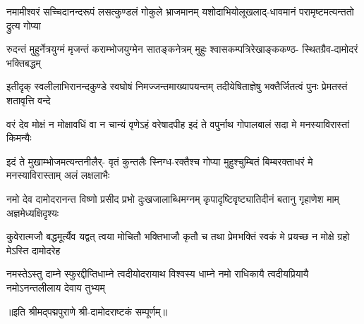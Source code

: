 
\fourlineindentedshloka
{नमामीश्वरं सच्चिदानन्दरूपं}
{लसत्कुण्डलं गोकुले भ्राजमानम्}
{यशोदाभियोलूखलाद्-धावमानं}
{परामृष्टमत्यन्ततो द्रुत्य गोप्या}

\fourlineindentedshloka
{रुदन्तं मुहुर्नेत्रयुग्मं मृजन्तं}
{कराम्भोजयुग्मेन सातङ्कनेत्रम्}
{मुहुः श्वासकम्पत्रिरेखाङ्ककण्ठ-}
{स्थितग्रैव-दामोदरं भक्तिबद्धम्}

\fourlineindentedshloka
{इतीदृक् स्वलीलाभिरानन्दकुण्डे}
{स्वघोषं निमज्जन्तमाख्यापयन्तम्}
{तदीयेषिताज्ञेषु भक्तैर्जितत्वं}
{पुनः प्रेमतस्तं शतावृत्ति वन्दे}

\fourlineindentedshloka
{वरं देव मोक्षं न मोक्षावधिं वा}
{न चान्यं वृणेऽहं वरेषादपीह}
{इदं ते वपुर्नाथ गोपालबालं}
{सदा मे मनस्याविरास्तां किमन्यैः}

\fourlineindentedshloka
{इदं ते मुखाम्भोजमत्यन्तनीलैर्-}
{वृतं कुन्तलैः स्निग्ध-रक्तैश्च गोप्या}
{मुहुश्चुम्बितं बिम्बरक्ताधरं मे}
{मनस्याविरास्ताम् अलं लक्षलाभैः}

\fourlineindentedshloka
{नमो देव दामोदरानन्त विष्णो}
{प्रसीद प्रभो दुःखजालाब्धिमग्नम्}
{कृपादृष्टिवृष्ट्यातिदीनं बतानु}
{गृहाणेश माम् अज्ञमेध्यक्षिदृश्यः}

\fourlineindentedshloka
{कुवेरात्मजौ बद्धमूर्त्यैव यद्वत्}
{त्वया मोचितौ भक्तिभाजौ कृतौ च}
{तथा प्रेमभक्तिं स्वकं मे प्रयच्छ}
{न मोक्षे ग्रहो मेऽस्ति दामोदरेह}

\fourlineindentedshloka
{नमस्तेऽस्तु दाम्ने स्फुरद्दीप्तिधाम्ने}
{त्वदीयोदरायाथ विश्वस्य धाम्ने}
{नमो राधिकायै त्वदीयप्रियायै}
{नमोऽनन्तलीलाय देवाय तुभ्यम्}

॥इति श्रीमद्पद्मपुराणे श्री-दामोदराष्टकं सम्पूर्णम्॥